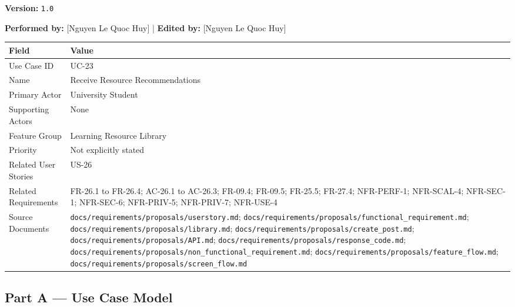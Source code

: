 \documentclass[12pt]{article}
\renewcommand{\baselinestretch}{1.5}
\begin{document}
\textbf{Version:} \texttt{1.0}
\par\medskip

\textbf{Performed by:} [Nguyen Le Quoc Huy] | \textbf{Edited by:} [Nguyen Le Quoc Huy]
\par\medskip

\begingroup
\small
\renewcommand{\baselinestretch}{1.0}\selectfont
\renewcommand{\arraystretch}{1.15}
\setlength{\tabcolsep}{6pt}
\begin{longtable}{|>{\raggedright\arraybackslash}p{}|>{\raggedright\arraybackslash}p{}|}
\hline
\textbf{Field} & \textbf{Value} \\ \hline
\endhead
Use Case ID & UC-23 \\ \hline
Name & Receive Resource Recommendations \\ \hline
Primary Actor & University Student \\ \hline
Supporting Actors & None \\ \hline
Feature Group & Learning Resource Library \\ \hline
Priority & Not explicitly stated \\ \hline
Related User Stories & US-26 \\ \hline
Related Requirements & FR-26.1 to FR-26.4; AC-26.1 to AC-26.3; FR-09.4; FR-09.5; FR-25.5; FR-27.4; NFR-PERF-1; NFR-SCAL-4; NFR-SEC-1; NFR-SEC-6; NFR-PRIV-5; NFR-PRIV-7; NFR-USE-4 \\ \hline
Source Documents & \texttt{docs/requirements/proposals/userstory.md}; \texttt{docs/requirements/proposals/functional\_requirement.md}; \texttt{docs/requirements/proposals/library.md}; \texttt{docs/requirements/proposals/create\_post.md}; \texttt{docs/requirements/proposals/API.md}; \texttt{docs/requirements/proposals/response\_code.md}; \texttt{docs/requirements/proposals/non\_functional\_requirement.md}; \texttt{docs/requirements/proposals/feature\_flow.md}; \texttt{docs/requirements/proposals/screen\_flow.md} \\ \hline
\end{longtable}
\endgroup
\par\medskip

\hypertarget{sec:part-a-use-case-model}{}
\subsection*{Part A --- Use Case Model}
\par\medskip
\end{document}
